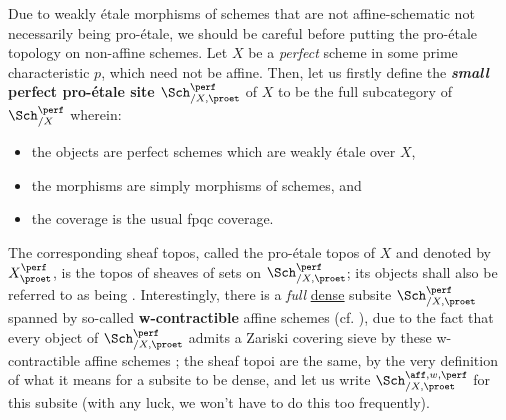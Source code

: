                     \begin{remark} \label{remark: non_affine_perfect_pro_etale_sites}
                        Due to weakly \'etale morphisms of schemes that are not affine-schematic not necessarily being pro-\'etale, we should be careful before putting the pro-\'etale topology on non-affine schemes. Let $X$ be a \textit{perfect} scheme in some prime characteristic $p$, which need not be affine. Then, let us firstly define the \textbf{\textit{small} perfect pro-\'etale site $\Sch_{/X, \proet}^{\perf}$} of $X$ to be the full subcategory of $\Sch_{/X}^{\perf}$ wherein:
                            \begin{itemize}
                                \item the objects are perfect schemes which are weakly \'etale over $X$,
                                \item the morphisms are simply morphisms of schemes, and
                                \item the coverage is the usual fpqc coverage.
                            \end{itemize}
                        The corresponding sheaf topos, called the pro-\'etale topos of $X$ and denoted by $X^{\perf}_{\proet}$, is the topos of sheaves of sets on $\Sch_{/X, \proet}^{\perf}$; its objects shall also be referred to as being . Interestingly, there is a \textit{full} \href{https://ncatlab.org/nlab/show/dense+sub-site}{\underline{dense}} subsite $\Sch_{/X, \proet}^{\perf}$ spanned by so-called \textbf{w-contractible} affine schemes (cf. \cite[\href{https://stacks.math.columbia.edu/tag/0980}{Tag 0980}]{stacks}), due to the fact that every object of $\Sch_{/X, \proet}^{\perf}$ admits a Zariski covering sieve by these w-contractible affine schemes \cite[Theorem 1.5]{bhatt_scholze_2014_pro_etale}; the sheaf topoi are the same, by the very definition of what it means for a subsite to be dense, and let us write $\Sch_{/X, \proet}^{\aff, w, \perf}$ for this subsite (with any luck, we won't have to do this too frequently).
                    \end{remark}
                    
